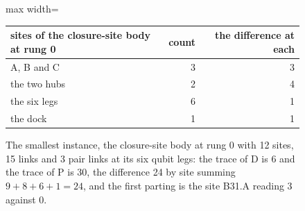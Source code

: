 \begin{figure}[h]
\centering
\begin{adjustbox}{max width=\linewidth}\begin{tabular}{lrr}
\hline
sites of the closure-site body at rung 0 & count & the difference at each \\
\hline
A, B and C & 3 & 3 \\
the two hubs & 2 & 4 \\
the six legs & 6 & 1 \\
the dock & 1 & 1 \\
\hline
\end{tabular}\end{adjustbox}
\caption{The smallest instance, the closure-site body at rung 0 with 12 sites, 15 links and 3 pair links at its six qubit legs: the trace of D is 6 and the trace of P is 30, the difference 24 by site summing $9 + 8 + 6 + 1 = 24$, and the first parting is the site B31.A reading 3 against 0.}
\end{figure}

